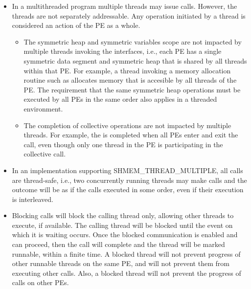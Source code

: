 \begin{itemize}[leftmargin=*]

\item
In a multithreaded \openshmem{} program multiple threads may issue \openshmem{}
calls. However, the threads are not separately addressable. 
Any \openshmem{} operation initiated by a thread is considered an action of the
\ac{PE} as a whole.

    \begin{itemize}
    \item
    The symmetric heap and symmetric variables scope
    are not impacted by multiple threads invoking the
    \openshmem{} interfaces, i.e., 
    each \ac{PE} has a single symmetric data segment and symmetric heap that is shared by
    all threads within that \ac{PE}.  For example, a thread invoking a memory allocation
    routine such as  
    allocates memory that is accesible by all threads of the \ac{PE}. 
    The requirement that the same symmetric heap operations must
    be executed by all \acp{PE} in the same order also applies in a threaded
    environment. 

    \item
    The completion of collective operations are not impacted by multiple threads. 
    For example, the  is completed when all \acp{PE} enter and
    exit the  call, even though only one thread in the \ac{PE} is
    participating in the collective call. 
    \end{itemize}                	

\item In an \openshmem{} implementation supporting SHMEM\_THREAD\_MULTIPLE, 
all \openshmem{} calls are thread-safe, i.e., two concurrently running threads
may make \openshmem{} calls and the outcome will be as if the calls executed in
some order, even if their execution is interleaved.

\item Blocking \openshmem{} calls will block the calling thread only, allowing
other threads to execute, if available. The calling thread will be blocked until the
event on which it is waiting occurs. Once the blocked communication is enabled
and can proceed, then the call will complete and the thread will be marked
runnable, within a finite time. A blocked thread will not prevent progress of
other runnable threads on the same \ac{PE}, and will not prevent them from
executing other \openshmem{} calls. Also, a blocked thread will not prevent the
progress of \openshmem{} calls on other \acp{PE}. 
 

\end{itemize}
